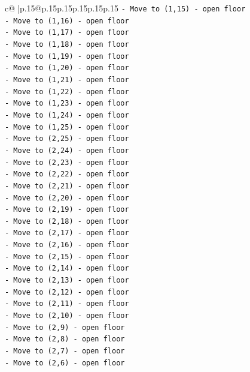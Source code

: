 \documentclass{article}
\begin{document}
{\begin{supertabular}{c@{$\;$}|p{.15\linewidth}@{}p{.15\linewidth}p{.15\linewidth}p{.15\linewidth}p{.15\linewidth}p{.15\linewidth}}
{{{\texttt{{-} Move to (1,15) {-} open floor} \\
\texttt{{-} Move to (1,16) {-} open floor} \\
\texttt{{-} Move to (1,17) {-} open floor} \\
\texttt{{-} Move to (1,18) {-} open floor} \\
\texttt{{-} Move to (1,19) {-} open floor} \\
\texttt{{-} Move to (1,20) {-} open floor} \\
\texttt{{-} Move to (1,21) {-} open floor} \\
\texttt{{-} Move to (1,22) {-} open floor} \\
\texttt{{-} Move to (1,23) {-} open floor} \\
\texttt{{-} Move to (1,24) {-} open floor} \\
\texttt{{-} Move to (1,25) {-} open floor} \\
\texttt{{-} Move to (2,25) {-} open floor} \\
\texttt{{-} Move to (2,24) {-} open floor} \\
\texttt{{-} Move to (2,23) {-} open floor} \\
\texttt{{-} Move to (2,22) {-} open floor} \\
\texttt{{-} Move to (2,21) {-} open floor} \\
\texttt{{-} Move to (2,20) {-} open floor} \\
\texttt{{-} Move to (2,19) {-} open floor} \\
\texttt{{-} Move to (2,18) {-} open floor} \\
\texttt{{-} Move to (2,17) {-} open floor} \\
\texttt{{-} Move to (2,16) {-} open floor} \\
\texttt{{-} Move to (2,15) {-} open floor} \\
\texttt{{-} Move to (2,14) {-} open floor} \\
\texttt{{-} Move to (2,13) {-} open floor} \\
\texttt{{-} Move to (2,12) {-} open floor} \\
\texttt{{-} Move to (2,11) {-} open floor} \\
\texttt{{-} Move to (2,10) {-} open floor} \\
\texttt{{-} Move to (2,9) {-} open floor} \\
\texttt{{-} Move to (2,8) {-} open floor} \\
\texttt{{-} Move to (2,7) {-} open floor} \\
\texttt{{-} Move to (2,6) {-} open floor} \\
}}}
\end{supertabular}}
\end{document}
